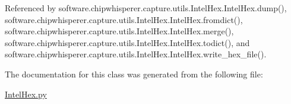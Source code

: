 Referenced by software.\+chipwhisperer.\+capture.\+utils.\+Intel\+Hex.\+Intel\+Hex.\+dump(), software.\+chipwhisperer.\+capture.\+utils.\+Intel\+Hex.\+Intel\+Hex.\+fromdict(), software.\+chipwhisperer.\+capture.\+utils.\+Intel\+Hex.\+Intel\+Hex.\+merge(), software.\+chipwhisperer.\+capture.\+utils.\+Intel\+Hex.\+Intel\+Hex.\+todict(), and software.\+chipwhisperer.\+capture.\+utils.\+Intel\+Hex.\+Intel\+Hex.\+write\+\_\+hex\+\_\+file().



The documentation for this class was generated from the following file\+:\begin{DoxyCompactItemize}
\item 
\hyperlink{IntelHex_8py}{Intel\+Hex.\+py}\end{DoxyCompactItemize}
